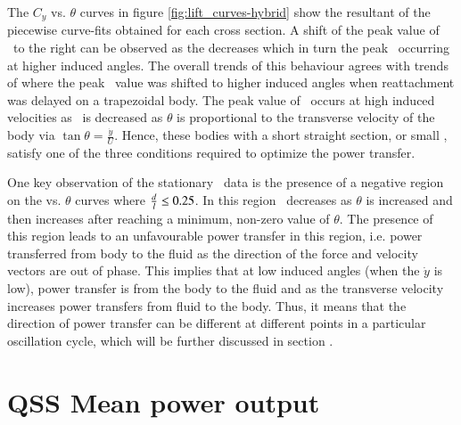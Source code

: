  

The $C_y$ vs. $\theta$ curves in figure \ref{fig:lift_curves-hybrid} show the resultant of the piecewise curve-fits obtained for each cross section. A shift of the peak value of \cy \ to the right can be observed as the \ratio decreases which in turn the peak \cy\ occurring at higher induced angles. The overall trends of this behaviour agrees with trends of \citet{Luo1994} where the peak \cy\ value was shifted to higher induced angles when reattachment was delayed on a trapezoidal body. The peak value of \cy\ occurs at high induced velocities as \ratio\ is decreased as $\theta$ is proportional to the transverse velocity of the body via $\tan{\theta}=\frac{\dot{y}}{U}$. Hence, these bodies with a short straight section, or small \ratio, satisfy one of the three conditions required to optimize the power transfer. 

One key observation of the stationary \cy \ data is the presence of a  negative region on the \cy vs. $\theta$ curves  where $\frac{d}{l}\leq0.25$. In this region \cy\ decreases as $\theta$ is increased and then increases after reaching a minimum, non-zero value of $\theta$. The presence of this region leads to an unfavourable power transfer in this region, i.e. power transferred from body to the fluid as the direction of the force and velocity vectors are out of phase. This implies that at low induced angles (when the $\dot{y}$ is low), power transfer is from the body to the fluid and as the transverse velocity increases power transfers from fluid to the body. Thus, it means that the direction of power transfer can be different at different points in a particular oscillation cycle, which will be further discussed in section . 



 \section{QSS Mean power output}
 \label{sec:mean power}
 
  
 
 
